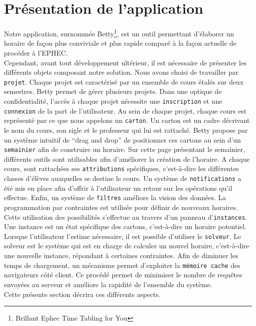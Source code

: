 

\chapter{Présentation de l'application}
Notre application, surnommée Betty\footnote{Brillant Ephec Time Tabling for You}, est un outil permettant d'élaborer un horaire de façon plus conviviale et plus rapide comparé à la façon actuelle de procéder à l'EPHEC.\\
\newline
\indent
Cependant, avant tout développement ultérieur, il est nécessaire de présenter les différents objets composant notre solution. Nous avons choisi de travailler par \texttt{projet}. Chaque projet est caractérisé par un ensemble de cours étalés sur deux semestres. Betty permet de gérer plusieurs projets. Dans une optique de confidentialité, l'accès à chaque projet nécessite une \texttt{inscription} et une \texttt{connexion} de la part de l'utilisateur.
\newline
\indent
Au sein de chaque projet, chaque cours est représenté par ce que nous appelons un \texttt{carton}. Un carton est un cadre décrivant le nom du cours, son sigle et le professeur qui lui est rattaché. Betty propose par un système intuitif de \enquote{drag and drop} de positionner ces cartons au sein d'un \texttt{semainier} afin de construire un horaire.
\newline
\indent
Sur cette page présentant le semainier, différents outils sont utilisables afin d'améliorer la création de l'horaire. A chaque cours, sont rattachées ses \texttt{attributions} spécifiques, c'est-à-dire les différentes classes d'élèves auxquelles se destine le cours. Un système de \texttt{notifications} a été mis en place afin d'offrir à l'utilisateur un retour sur les opérations qu'il effectue. Enfin, un système de \texttt{filtres} améliore la vision des données. 
\newline
\indent
La programmation par contraintes est utilisée pour définir de nouveaux horaires. Cette utilisation des possibilités s'effectue au travers d'un panneau d'\texttt{instances}. Une instance  est un état spécifique des cartons, c'est-à-dire un horaire potentiel. Lorsque l'utilisateur l'estime nécessaire, il est possible d'utiliser le  \texttt{solveur}. Le solveur est le système qui est en charge de calculer un nouvel horaire, c'est-à-dire une nouvelle instance, répondant à certaines contraintes.
\newline
\indent
Afin de diminuer les temps de chargement, un mécanisme permet d'exploiter la \texttt{mémoire cache} des navigateurs côté client. Ce procédé permet de minimiser le nombre de requêtes envoyées au serveur et améliore la rapidité de l'ensemble du système.\\
\newline
\indent
Cette présente section décrira ces différents aspects.


